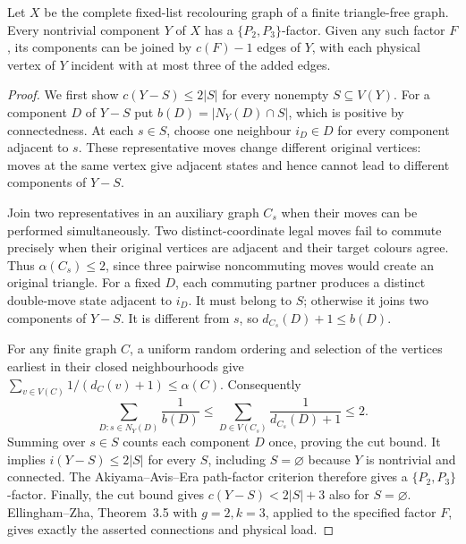 
\begin{lemma}
Let $X$ be the complete fixed-list recolouring graph of a finite
triangle-free graph. Every nontrivial component $Y$ of $X$ has a
$\{P_2,P_3\}$-factor. Given any such factor $F$, its components can
be joined by $c(F)-1$ edges of $Y$, with each physical vertex of $Y$
incident with at most three of the added edges.
\end{lemma}
\begin{proof}
We first show $c(Y-S)\le2|S|$ for every nonempty $S\subseteq V(Y)$.
For a component $D$ of $Y-S$ put
$b(D)=|N_Y(D)\cap S|$, which is positive by connectedness.
At each $s\in S$, choose one neighbour $i_D\in D$ for every
component adjacent to $s$. These representative moves change
different original vertices: moves at the same vertex give adjacent
states and hence cannot lead to different components of $Y-S$.

Join two representatives in an auxiliary graph $C_s$ when their
moves can be performed simultaneously. Two distinct-coordinate
legal moves fail to commute precisely when their original vertices
are adjacent and their target colours agree. Thus $\alpha(C_s)\le2$,
since three pairwise noncommuting moves would create an original
triangle. For a fixed $D$, each commuting partner produces a
distinct double-move state adjacent to $i_D$. It must belong to $S$;
otherwise it joins two components of $Y-S$. It is different from $s$,
so $d_{C_s}(D)+1\le b(D)$.

For any finite graph $C$, a uniform random ordering and selection
of the vertices earliest in their closed neighbourhoods give
$\sum_{v\in V(C)}1/(d_C(v)+1)\le\alpha(C)$. Consequently
\[
\sum_{D:s\in N_Y(D)}\frac1{b(D)}
\le\sum_{D\in V(C_s)}\frac1{d_{C_s}(D)+1}\le2.
\]
Summing over $s\in S$ counts each component $D$ once, proving the
cut bound. It implies $i(Y-S)\le2|S|$ for every $S$, including
$S=\varnothing$ because $Y$ is nontrivial and connected. The
Akiyama--Avis--Era path-factor criterion therefore gives a
$\{P_2,P_3\}$-factor. Finally, the cut bound gives
$c(Y-S)<2|S|+3$ also for $S=\varnothing$. Ellingham--Zha,
Theorem~3.5 with $g=2,k=3$, applied to the specified factor $F$,
gives exactly the asserted connections and physical load.
\end{proof}

